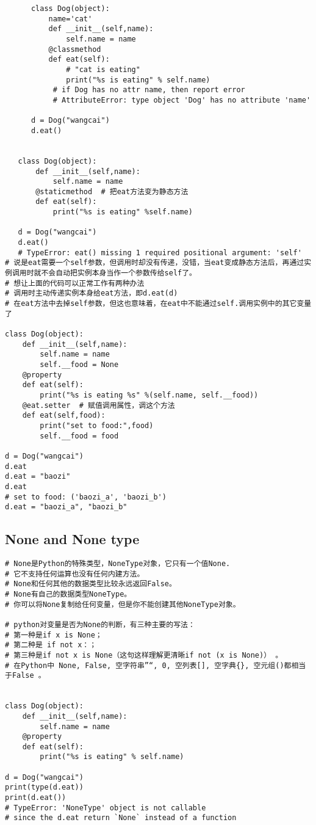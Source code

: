 \documentclass[11pt]{article}
\begin{document}
\begin{verbatim}
      class Dog(object):
          name='cat'
          def __init__(self,name):
              self.name = name
          @classmethod
          def eat(self):
              # "cat is eating"
              print("%s is eating" % self.name)
           # if Dog has no attr name, then report error
           # AttributeError: type object 'Dog' has no attribute 'name'

      d = Dog("wangcai")
      d.eat()


   class Dog(object):
       def __init__(self,name):
           self.name = name
       @staticmethod  # 把eat方法变为静态方法
       def eat(self):
           print("%s is eating" %self.name)

   d = Dog("wangcai")
   d.eat()
   # TypeError: eat() missing 1 required positional argument: 'self'
# 说是eat需要一个self参数，但调用时却没有传递，没错，当eat变成静态方法后，再通过实例调用时就不会自动把实例本身当作一个参数传给self了。
# 想让上面的代码可以正常工作有两种办法
# 调用时主动传递实例本身给eat方法，即d.eat(d)
# 在eat方法中去掉self参数，但这也意味着，在eat中不能通过self.调用实例中的其它变量了

class Dog(object):
    def __init__(self,name):
        self.name = name
        self.__food = None
    @property
    def eat(self):
        print("%s is eating %s" %(self.name, self.__food))
    @eat.setter  # 赋值调用属性，调这个方法
    def eat(self,food):
        print("set to food:",food)
        self.__food = food

d = Dog("wangcai")
d.eat
d.eat = "baozi"
d.eat
# set to food: ('baozi_a', 'baozi_b')
d.eat = "baozi_a", "baozi_b"

\end{verbatim}


\subsection{None and None type}
\label{sec:orgff1bb07}
\begin{verbatim}
# None是Python的特殊类型，NoneType对象，它只有一个值None.
# 它不支持任何运算也没有任何内建方法。
# None和任何其他的数据类型比较永远返回False。
# None有自己的数据类型NoneType。
# 你可以将None复制给任何变量，但是你不能创建其他NoneType对象。

# python对变量是否为None的判断，有三种主要的写法：
# 第一种是if x is None；
# 第二种是 if not x：；
# 第三种是if not x is None（这句这样理解更清晰if not (x is None)） 。
# 在Python中 None, False, 空字符串”“, 0, 空列表[], 空字典{}, 空元组()都相当于False 。


class Dog(object):
    def __init__(self,name):
        self.name = name
    @property
    def eat(self):
        print("%s is eating" % self.name)

d = Dog("wangcai")
print(type(d.eat))
print(d.eat())
# TypeError: 'NoneType' object is not callable
# since the d.eat return `None` instead of a function
\end{verbatim}
\end{document}
